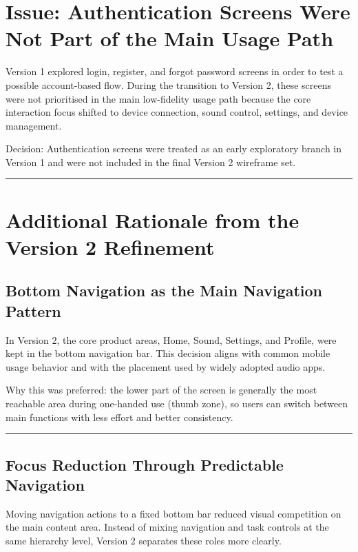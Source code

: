 \documentclass[12pt, a4paper]{report}
\newenvironment{highlight}{%
  \par\vspace{6pt}%
  \noindent%
  \begin{lrbox}{\hlbox}%
    \begin{minipage}{\dimexpr\linewidth-14pt\relax}%
      \vspace{6pt}\small%
}{%
      \vspace{6pt}%
    \end{minipage}%
  \end{lrbox}%
  \noindent\colorbox{lightgray}{%
    \hspace{2pt}%
    \textcolor{accentblue}{\rule[-0.2\baselineskip]{2pt}{\dimexpr\ht\hlbox+\dp\hlbox\relax}}%
    \hspace{8pt}\usebox{\hlbox}\hspace{2pt}%
  }%
  \par\vspace{6pt}%
}
\begin{document}
\section{Issue: Authentication Screens Were Not Part of the Main Usage Path}

Version 1 explored login, register, and forgot password screens in order to test
a possible account-based flow. During the transition to Version 2, these screens
were not prioritised in the main low-fidelity usage path because the core
interaction focus shifted to device connection, sound control, settings, and
device management.

\begin{highlight}
Decision: Authentication screens were treated as an early exploratory branch in
Version 1 and were not included in the final Version 2 wireframe set.
\end{highlight}

\section{Additional Rationale from the Version 2 Refinement}

\subsection{Bottom Navigation as the Main Navigation Pattern}

In Version 2, the core product areas, Home, Sound, Settings, and Profile, were
kept in the bottom navigation bar. This decision aligns with common mobile usage
behavior and with the placement used by widely adopted audio apps.

\begin{highlight}
Why this was preferred: the lower part of the screen is generally the most
reachable area during one-handed use (thumb zone), so users can switch between
main functions with less effort and better consistency.
\end{highlight}

\subsection{Focus Reduction Through Predictable Navigation}

Moving navigation actions to a fixed bottom bar reduced visual competition on the
main content area. Instead of mixing navigation and task controls at the same
hierarchy level, Version 2 separates these roles more clearly.
\end{document}
